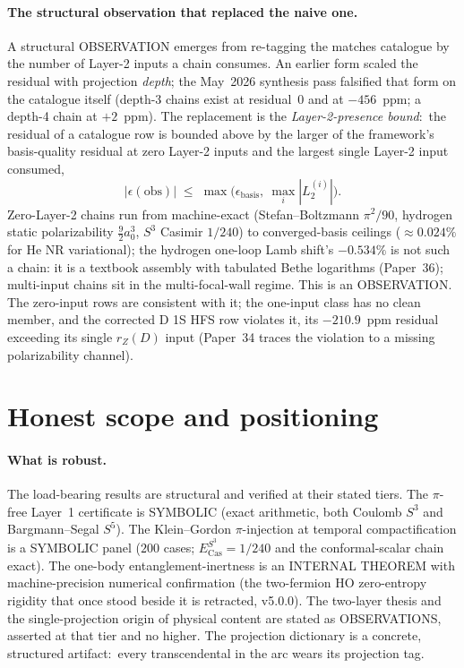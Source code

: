 \documentclass[aps,pra,twocolumn,superscriptaddress,longbibliography,nofootinbib]{revtex4-2}
\begin{document}
\paragraph{The structural observation that replaced the naive one.}
A structural OBSERVATION emerges from re-tagging the matches
catalogue by the number of Layer-2 inputs a chain consumes.  An earlier
form scaled the residual with projection \emph{depth}; the May~2026
synthesis pass falsified that form on the catalogue itself (depth-3
chains exist at residual~$0$ and at $-456$~ppm; a depth-4 chain at
$+2$~ppm).  The replacement is the \emph{Layer-2-presence
bound}:\ the residual of a catalogue row is bounded above by the larger
of the framework's basis-quality residual at zero Layer-2 inputs and the
largest single Layer-2 input consumed,
\[
|\epsilon(\text{obs})| \;\leq\;
\max\!\bigl(\epsilon_{\text{basis}},\ \max_i |L_2^{(i)}|\bigr).
\]
Zero-Layer-2 chains run from machine-exact (Stefan--Boltzmann $\pi^2/90$,
hydrogen static polarizability $\tfrac92 a_0^3$, $S^3$ Casimir $1/240$) to
converged-basis ceilings ($\approx0.024\%$ for He NR variational);
the hydrogen one-loop Lamb shift's $-0.534\%$ is not such a chain: it is a
textbook assembly with tabulated Bethe logarithms (Paper~36);
multi-input chains sit in the multi-focal-wall regime.  This is an
OBSERVATION.  The zero-input rows are consistent with it; the one-input
class has no clean member, and the corrected D 1S HFS row violates it,
its $-210.9$~ppm residual exceeding its single $r_Z(D)$ input (Paper~34
traces the violation to a missing polarizability channel).

\section{Honest scope and positioning}

\paragraph{What is robust.}
The load-bearing results are structural and verified at their stated
tiers.  The $\pi$-free Layer~1 certificate is SYMBOLIC (exact arithmetic,
both Coulomb $S^3$ and Bargmann--Segal $S^5$).  The Klein--Gordon
$\pi$-injection at temporal compactification is a SYMBOLIC panel
($200$ cases; $E_{\mathrm{Cas}}^{S^3}=1/240$ and the conformal-scalar
chain exact).  The one-body entanglement-inertness is an INTERNAL THEOREM with machine-precision numerical confirmation (the two-fermion HO zero-entropy rigidity that once stood beside it is retracted, v5.0.0).  The two-layer thesis and the single-projection
origin of physical content are stated as OBSERVATIONS, asserted at that
tier and no higher.  The projection dictionary is a concrete, structured
artifact:\ every transcendental in the arc wears its projection tag.
\end{document}

